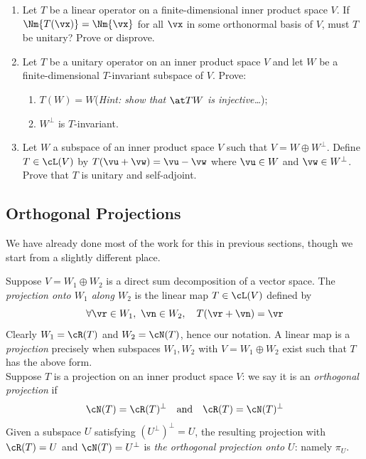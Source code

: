 \begin{exercises}
\begin{enumerate}[label=\thesubsection.\arabic*., align=right]
  \item Let $T$ be a linear operator on a finite-dimensional inner product space $V$. If $\Nm{T(\vx)}=\Nm{\vx}$ for all $\vx$ in some orthonormal basis of $V$, must $T$ be unitary? Prove or disprove.
  
  \item Let $T$ be a unitary operator on an inner product space $V$ and let $W$ be a finite-dimensional $T$-invariant subspace of $V$. Prove:
  \begin{enumerate}
    \item $T(W)=W$\quad (\emph{Hint: show that $\at TW$ is injective\ldots});
    \item $W^\perp$ is $T$-invariant.
	\end{enumerate}
	
	\item Let $W$ a subspace of an inner product space $V$ such that $V=W\oplus W^\perp$. Define $T\in\cL(V)$ by $T(\vu+\vw)=\vu-\vw$ where $\vu\in W$ and $\vw\in W^\perp$. Prove that $T$ is unitary and self-adjoint.
\end{enumerate}
\end{exercises}



\subsection{Orthogonal Projections}

We have already done most of the work for this in previous sections, though we start from a slightly different place.

\begin{defn}{}{}
Suppose $V=W_1\oplus W_2$ is a direct sum decomposition of a vector space. The \emph{projection onto $W_1$ along $W_2$} is the linear map $T\in\cL(V)$ defined by
\[\forall \vr\in W_1,\ \vn\in W_2,\quad T(\vr+\vn)=\vr\]
Clearly $W_1=\cR(T)$ and $W_2=\cN(T)$, hence our notation. A linear map is a \emph{projection} precisely when subspaces $W_1,W_2$ with $V=W_1\oplus W_2$ exist such that $T$ has the above form.\\[5pt]
Suppose $T$ is a projection on an inner product space $V$: we say it is an \emph{orthogonal projection} if
\[\cN(T)=\cR(T)^\perp\quad\text{and}\quad \cR(T)=\cN(T)^\perp\]
Given a subspace $U$ satisfying $(U^\perp)^\perp=U$, the resulting projection with $\cR(T)=U$ and $\cN(T)=U^\perp$ is \emph{the orthogonal projection onto $U$}: namely $\pi_U$.
\end{defn}


